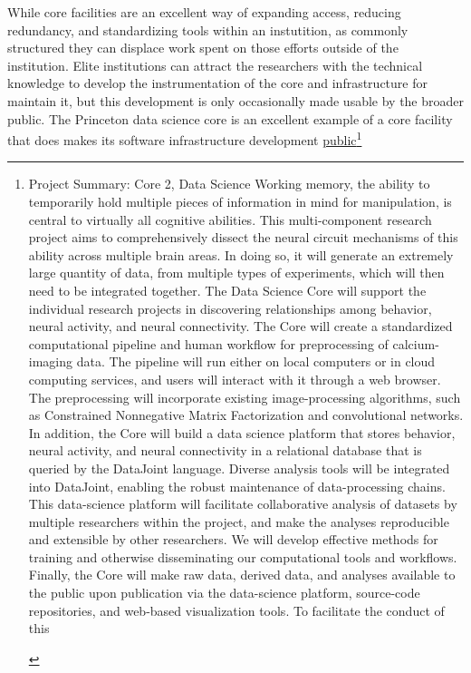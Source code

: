 \documentclass[11pt]{article}
\begin{document}
\begin{multicols}{2}
While core facilities are an excellent way of expanding access, reducing
redundancy, and standardizing tools within an instutition, as commonly
structured they can displace work spent on those efforts outside of the
institution. Elite institutions can attract the researchers with the
technical knowledge to develop the instrumentation of the core and
infrastructure for maintain it, but this development is only
occasionally made usable by the broader public. The Princeton data
science core is an excellent example of a core facility that does makes
its software infrastructure development
\href{https://github.com/BrainCOGS}{public}\footnote{\begin{leftbar}
  Project Summary: Core 2, Data Science Working memory, the ability to
  temporarily hold multiple pieces of information in mind for
  manipulation, is central to virtually all cognitive abilities. This
  multi-component research project aims to comprehensively dissect the
  neural circuit mechanisms of this ability across multiple brain areas.
  In doing so, it will generate an extremely large quantity of data,
  from multiple types of experiments, which will then need to be
  integrated together. The Data Science Core will support the individual
  research projects in discovering relationships among behavior, neural
  activity, and neural connectivity. The Core will create a standardized
  computational pipeline and human workflow for preprocessing of
  calcium-imaging data. The pipeline will run either on local computers
  or in cloud computing services, and users will interact with it
  through a web browser. The preprocessing will incorporate existing
  image-processing algorithms, such as Constrained Nonnegative Matrix
  Factorization and convolutional networks. In addition, the Core will
  build a data science platform that stores behavior, neural activity,
  and neural connectivity in a relational database that is queried by
  the DataJoint language. Diverse analysis tools will be integrated into
  DataJoint, enabling the robust maintenance of data-processing chains.
  This data-science platform will facilitate collaborative analysis of
  datasets by multiple researchers within the project, and make the
  analyses reproducible and extensible by other researchers. We will
  develop effective methods for training and otherwise disseminating our
  computational tools and workflows. Finally, the Core will make raw
  data, derived data, and analyses available to the public upon
  publication via the data-science platform, source-code repositories,
  and web-based visualization tools. To facilitate the conduct of this

\end{leftbar}}
\end{multicols}
\end{document}
